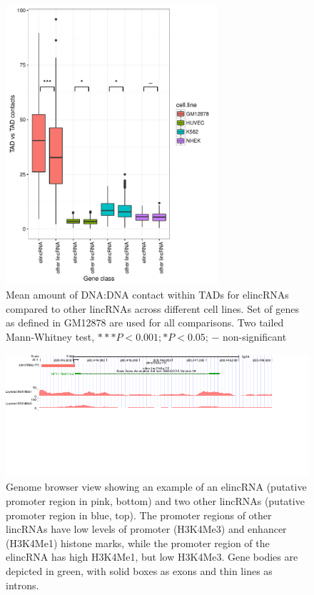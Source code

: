 \documentclass[11pt,a4paper]{report}
\begin{document}
\begin{figure}[ht]
	\includegraphics[width=0.7\textwidth]{Figures/6_TAD_TAD_contact.pdf}
	\caption{Mean amount of DNA:DNA contact within TADs for elincRNAs compared to other lincRNAs across different cell lines. Set of genes as defined in GM12878 are used for all comparisons. Two tailed Mann-Whitney test, $***P<0.001; *P<0.05$; $-$ non-significant}
	\label{TAD_TAD_contacts}
\end{figure}

\begin{figure}[ht]
	\includegraphics[width=1\textwidth]{Figures/7_merged_examples.pdf}
	\caption{Genome browser view showing an example of an elincRNA (putative promoter region in pink, bottom) and two other lincRNAs (putative promoter region in blue, top). The promoter regions of other lincRNAs have low levels of promoter (H3K4Me3) and enhancer (H3K4Me1) histone marks, while the promoter region of the elincRNA has high H3K4Me1, but low H3K4Me3. Gene bodies are depicted in green, with solid boxes as exons and thin lines as introns.}
	\label{Genome_browser}
\end{figure}
\FloatBarrier
\end{document}
